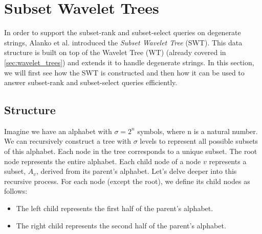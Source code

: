 \section{Subset Wavelet Trees}
In order to support the subset-rank and subset-select queries on degenerate strings, Alanko et al. \cite{SubsetWT} introduced the \emph{Subset Wavelet Tree} (SWT). This data structure is built on top of the Wavelet Tree (WT) \cite{GrossiWT2003} (already covered in \autoref{sec:wavelet_trees}) and extends it to handle degenerate strings. In this section, we will first see how the SWT is constructed and then how it can be used to answer subset-rank and subset-select queries efficiently.

\subsection{Structure}

Imagine we have an alphabet with $\sigma = 2^n$ symbols, where n is a natural number. We can recursively construct a tree with $\sigma$ levels to represent all possible subsets of this alphabet. Each node in the tree corresponds to a unique subset. The root node represents the entire alphabet. Each child node of a node $v$ represents a subset, $A_v$, derived from its parent's alphabet. Let's delve deeper into this recursive process. For each node (except the root), we define its child nodes as follows:

\begin{itemize}
    \item The left child represents the first half of the parent's alphabet.
    \item The right child represents the second half of the parent's alphabet.
\end{itemize}

